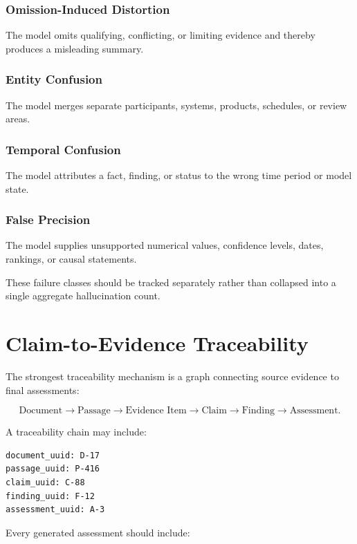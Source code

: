 \documentclass[11pt]{report}
\begin{document}
\subsection{Omission-Induced Distortion}

The model omits qualifying, conflicting, or limiting evidence and thereby produces a misleading summary.

\subsection{Entity Confusion}

The model merges separate participants, systems, products, schedules, or review areas.

\subsection{Temporal Confusion}

The model attributes a fact, finding, or status to the wrong time period or model state.

\subsection{False Precision}

The model supplies unsupported numerical values, confidence levels, dates, rankings, or causal statements.

These failure classes should be tracked separately rather than collapsed into a single aggregate hallucination count.

\chapter{Claim-to-Evidence Traceability}

The strongest traceability mechanism is a graph connecting source evidence to final assessments:

\[
\text{Document}
\rightarrow
\text{Passage}
\rightarrow
\text{Evidence Item}
\rightarrow
\text{Claim}
\rightarrow
\text{Finding}
\rightarrow
\text{Assessment}.
\]

A traceability chain may include:

\begin{verbatim}
document_uuid: D-17
passage_uuid: P-416
claim_uuid: C-88
finding_uuid: F-12
assessment_uuid: A-3
\end{verbatim}

Every generated assessment should include:
\end{document}
